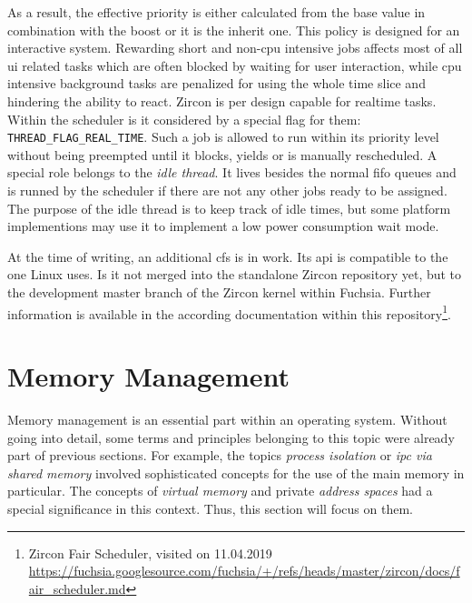 As a result, the effective priority is either calculated from the base value in combination with the boost or it is the inherit one\cite{zircon-scheduling}.
This policy is designed for an interactive system.
Rewarding short and non-\ac{cpu} intensive jobs affects most of all \ac{ui} related tasks which are often blocked by waiting for user interaction, while \ac{cpu} intensive background tasks are penalized for using the whole time slice and hindering the ability to react.
%
Zircon is per design capable for realtime tasks.
Within the scheduler is it considered by a special flag for them: \texttt{THREAD\_FLAG\_REAL\_TIME}.
Such a job is allowed to run within its priority level without being preempted until it blocks, yields or is manually rescheduled\cite{zircon-scheduling}.
%
A special role belongs to the \textit{idle thread}.
It lives besides the normal \ac{fifo} queues and is runned by the scheduler if there are not any other jobs ready to be assigned.
The purpose of the idle thread is to keep track of idle times, but some platform implementions may use it to implement a low power consumption wait mode\cite{zircon-scheduling}.

At the time of writing, an additional \ac{cfs} is in work.
Its \ac{api} is compatible to the one Linux uses.
Is it not merged into the standalone Zircon repository yet, but to the development master branch of the Zircon kernel within Fuchsia.
Further information is available in the according documentation within this repository\footnote{Zircon Fair Scheduler, visited on 11.04.2019\\ \url{https://fuchsia.googlesource.com/fuchsia/+/refs/heads/master/zircon/docs/fair_scheduler.md}}.


\section{Memory Management}\label{sec:memory-management}
Memory management is an essential part within an operating system.
Without going into detail, some terms and principles belonging to this topic were already part of previous sections.
For example, the topics \textit{process isolation} or \textit{\ac{ipc} via shared memory} involved sophisticated concepts for the use of the main memory in particular.
The concepts of \textit{virtual memory} and private \textit{address spaces} had a special significance in this context.
Thus, this section will focus on them.

